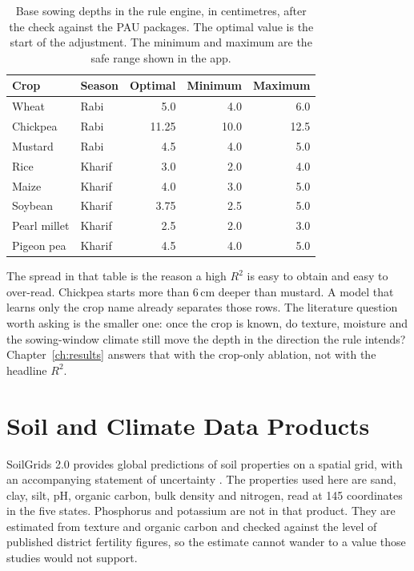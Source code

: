 \begin{table}[H]
\centering
\caption{Base sowing depths in the rule engine, in centimetres, after the check against the PAU packages. The optimal value is the start of the adjustment. The minimum and maximum are the safe range shown in the app.}
\label{tab:bands}
\small
\begin{tabular}{llrrr}
\toprule
\textbf{Crop} & \textbf{Season} & \textbf{Optimal} & \textbf{Minimum} & \textbf{Maximum} \\
\midrule
Wheat & Rabi & 5.0 & 4.0 & 6.0 \\
Chickpea & Rabi & 11.25 & 10.0 & 12.5 \\
Mustard & Rabi & 4.5 & 4.0 & 5.0 \\
Rice & Kharif & 3.0 & 2.0 & 4.0 \\
Maize & Kharif & 4.0 & 3.0 & 5.0 \\
Soybean & Kharif & 3.75 & 2.5 & 5.0 \\
Pearl millet & Kharif & 2.5 & 2.0 & 3.0 \\
Pigeon pea & Kharif & 4.5 & 4.0 & 5.0 \\
\bottomrule
\end{tabular}
\end{table}

The spread in that table is the reason a high $R^{2}$ is easy to obtain and easy to over-read. Chickpea starts more than 6\,cm deeper than mustard. A model that learns only the crop name already separates those rows. The literature question worth asking is the smaller one: once the crop is known, do texture, moisture and the sowing-window climate still move the depth in the direction the rule intends? Chapter~\ref{ch:results} answers that with the crop-only ablation, not with the headline $R^{2}$.

\section{Soil and Climate Data Products}
SoilGrids 2.0 provides global predictions of soil properties on a spatial grid, with an accompanying statement of uncertainty \cite{poggio2021soilgrids}. The properties used here are sand, clay, silt, pH, organic carbon, bulk density and nitrogen, read at 145 coordinates in the five states. Phosphorus and potassium are not in that product. They are estimated from texture and organic carbon and checked against the level of published district fertility figures, so the estimate cannot wander to a value those studies would not support.

